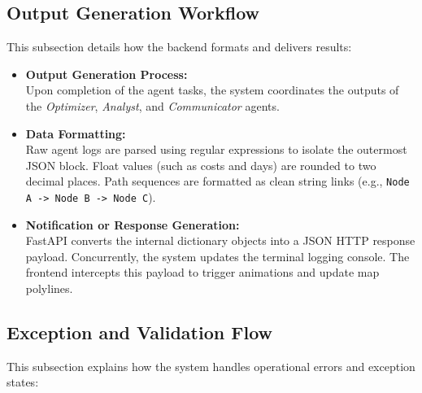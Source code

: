 \subsection[Output Generation Workflow]{Output Generation Workflow}
This subsection details how the backend formats and delivers results:

\begin{itemize}
    \item \textbf{Output Generation Process:} \\
    Upon completion of the agent tasks, the system coordinates the outputs of the \textit{Optimizer}, \textit{Analyst}, and \textit{Communicator} agents.
    \item \textbf{Data Formatting:} \\
    Raw agent logs are parsed using regular expressions to isolate the outermost JSON block. Float values (such as costs and days) are rounded to two decimal places. Path sequences are formatted as clean string links (e.g., \texttt{Node A -> Node B -> Node C}).
    \item \textbf{Notification or Response Generation:} \\
    FastAPI converts the internal dictionary objects into a JSON HTTP response payload. Concurrently, the system updates the terminal logging console. The frontend intercepts this payload to trigger animations and update map polylines.
\end{itemize}

\subsection[Exception and Validation Flow]{Exception and Validation Flow}
This subsection explains how the system handles operational errors and exception states:

